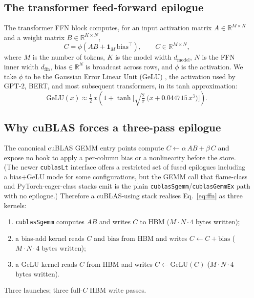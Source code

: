 \documentclass[11pt,a4paper]{article}
\begin{document}
\subsection{The transformer feed-forward epilogue}

The transformer FFN block computes, for an input activation matrix
$A \in \mathbb{R}^{M\times K}$ and a weight matrix $B \in \mathbb{R}^{K\times N}$,
\begin{equation}
C = \phi(AB + \mathbf{1}_M\,\mathrm{bias}^{\top}),
\qquad C \in \mathbb{R}^{M\times N},
\label{eq:ffn}
\end{equation}
where $M$ is the number of tokens, $K$ is the model width $d_{\mathrm{model}}$,
$N$ is the FFN inner width $d_{\mathrm{ffn}}$, $\mathrm{bias}\in\mathbb{R}^{N}$
is broadcast across rows, and $\phi$ is the activation. We take $\phi$ to be
the Gaussian Error Linear Unit (GeLU) \citep{hendrycks2016gelu}, the activation
used by GPT-2, BERT, and most subsequent transformers, in its tanh
approximation:
\begin{equation}
\mathrm{GeLU}(x) \approx
\tfrac{1}{2}\,x\left(1 + \tanh\!\Big[\sqrt{\tfrac{2}{\pi}}\,
\big(x + 0.044715\,x^{3}\big)\Big]\right).
\label{eq:gelu}
\end{equation}

\subsection{Why cuBLAS forces a three-pass epilogue}

The canonical cuBLAS GEMM entry points compute $C \leftarrow \alpha\,AB +
\beta\,C$ and expose no hook to apply a per-column bias or a nonlinearity
before the store. (The newer \texttt{cublasLt} interface offers a restricted
set of fused epilogues including a bias+GeLU mode for some configurations, but
the GEMM call that flame-class and PyTorch-eager-class stacks emit is the plain
\texttt{cublasSgemm}/\texttt{cublasGemmEx} path with no epilogue.) Therefore a
cuBLAS-using stack realises Eq.~\eqref{eq:ffn} as three kernels:
\begin{enumerate}\itemsep0.2em
\item \texttt{cublasSgemm} computes $AB$ and writes $C$ to HBM
($M\!\cdot\!N\!\cdot\!4$ bytes written);
\item a bias-add kernel reads $C$ and $\mathrm{bias}$ from HBM and writes
$C \leftarrow C + \mathrm{bias}$ ($M\!\cdot\!N\!\cdot\!4$ bytes written);
\item a GeLU kernel reads $C$ from HBM and writes $C \leftarrow \mathrm{GeLU}(C)$
($M\!\cdot\!N\!\cdot\!4$ bytes written).
\end{enumerate}
Three launches; three full-$C$ HBM write passes.
\end{document}
